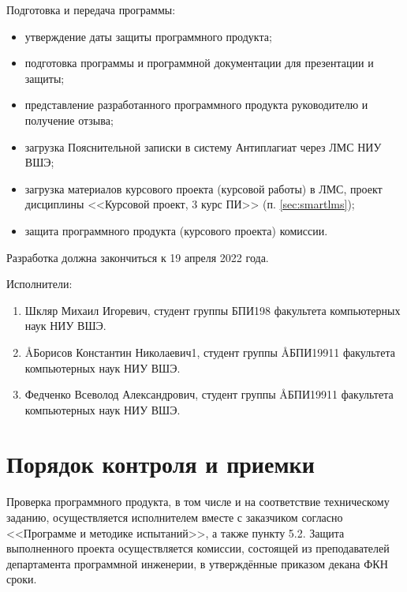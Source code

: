 \documentclass[a4paper,12pt,reqno]{article}
\begin{document}
  Подготовка и передача программы:
  \begin{itemize}
    \item утверждение даты защиты программного продукта;
    \item подготовка программы и программной документации для презентации и защиты;
    \item представление разработанного программного продукта руководителю и получение отзыва;
    \item загрузка Пояснительной записки в систему Антиплагиат через ЛМС НИУ ВШЭ;
    \item загрузка материалов курсового проекта (курсовой работы) в ЛМС, проект дисциплины <<Курсовой проект, 3 курс ПИ>> (п. \ref{sec:smartlms});
    \item защита программного продукта (курсового проекта) комиссии.
  \end{itemize}
  Разработка должна закончиться к 19 апреля 2022 года.

  Исполнители:
  \begin{enumerate}
    \item Шкляр Михаил Игоревич, студент группы БПИ198 факультета компьютерных наук НИУ ВШЭ.
    \item \AA{Борисов Константин Николаевич}{1}, студент группы \AA{БПИ199}{11} факультета компьютерных наук НИУ ВШЭ.
    \item Федченко Всеволод Александрович, студент группы \AA{БПИ199}{11} факультета компьютерных наук НИУ ВШЭ.
  \end{enumerate}

  \section{Порядок контроля и приемки}
  Проверка программного продукта, в том числе и на соответствие техническому заданию,
  осуществляется исполнителем вместе с заказчиком согласно <<Программе и методике испытаний>>, а также пункту 5.2.
  Защита выполненного проекта осуществляется комиссии, состоящей из преподавателей департамента программной инженерии,
  в утверждённые приказом декана ФКН сроки.

  \begin{CRTbibliography}
  \end{CRTbibliography}

  \CRTlistRegistration
\end{document}
